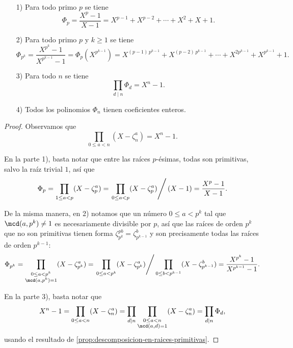\begin{teorema}
  ~

  \begin{enumerate}
  \item[1)] Para todo primo $p$ se tiene
    $$\Phi_p = \frac{X^p-1}{X-1} = X^{p-1} + X^{p-2} + \cdots + X^2 + X + 1.$$

  \item[2)] Para todo primo $p$ y $k \ge 1$ se tiene
    $$\Phi_{p^k} = \frac{X^{p^k} - 1}{X^{p^{k-1}} - 1} = \Phi_p (X^{p^{k-1}}) = X^{(p-1)\,p^{k-1}} + X^{(p-2)\,p^{k-1}} + \cdots + X^{2p^{k-1}} + X^{p^{k-1}} + 1.$$

  \item[3)] Para todo $n$ se tiene
    $$\prod_{d\mid n} \Phi_d = X^n - 1.$$

  \item[4)] Todos los polinomios $\Phi_n$ tienen coeficientes enteros.
  \end{enumerate}

  \begin{proof}
    Observamos que
    $$\prod_{0 \le a < n} (X - \zeta_n^a) = X^n - 1.$$

    En la parte 1), basta notar que entre las raíces $p$-ésimas, todas son
    primitivas, salvo la raíz trivial $1$, así que
    $$\Phi_p = \prod_{1 \le a < p} (X - \zeta_p^a) = \left.\prod_{0 \le a < p} (X - \zeta_p^a)\right/(X-1) = \frac{X^p-1}{X-1}.$$

    De la misma manera, en 2) notamos que un número $0 \le a < p^k$ tal que
    $\mcd (a, p^k) \ne 1$ es necesariamente divisible por $p$, así que
    las raíces de orden $p^k$ que no son primitivas tienen forma
    $\zeta_{p^k}^{pb} = \zeta_{p^{k-1}}^b$ y son precisamente todas las raíces
    de orden $p^{k-1}$:
    $$\Phi_{p^k} = \prod_{\substack{0 \le a < p^k \\ \mcd (a,p^k) = 1}} (X - \zeta_{p^k}^a) = \left.\prod_{0 \le a < p^k} (X - \zeta_{p^k}^a)\right/\prod_{0 \le b < p^{k-1}} (X - \zeta_{p^{k-1}}^b) = \frac{X^{p^k} - 1}{X^{p^{k-1}}-1}.$$

    En la parte 3), basta notar que
    $$X^n - 1 = \prod_{0\le a < n} (X - \zeta_n^a) = \prod_{d\mid n} \prod_{\substack{0 \le a < n \\ \mcd (a,d) = 1}} (X - \zeta_n^a) = \prod_{d\mid n} \Phi_d,$$
    usando el resultado de \ref{prop:descomposicion-en-raices-primitivas}.


\end{proof}
\end{teorema}
